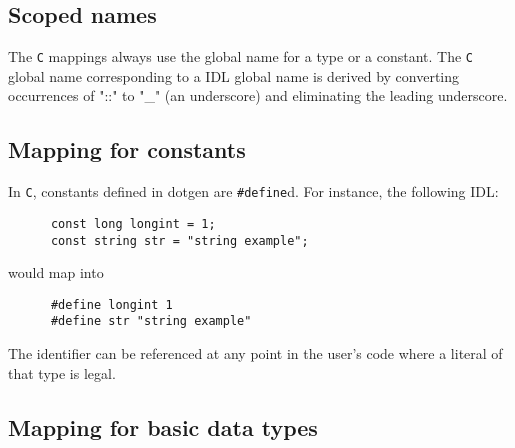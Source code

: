 %
%
%
%
%

\subsection{Scoped names}

The {\tt C} mappings always use the  global name for a type or a constant.  The
{\tt C} global  name corresponding to a \GenoM{} IDL global  name is derived by
converting  occurrences of  "::" to  "\_" (an  underscore) and  eliminating the
leading underscore.


\subsection{Mapping for constants}

In {\tt C}, constants defined in dotgen are {\tt \#define}d. For instance, the
following IDL:
\begin{verbatim}
      const long longint = 1;
      const string str = "string example";
\end{verbatim}

would map into
\begin{verbatim}
      #define longint 1
      #define str "string example"
\end{verbatim}

The  identifier can  be referenced  at any  point in  the user's  code  where a
literal of that type is legal.


\subsection{Mapping for basic data types}

